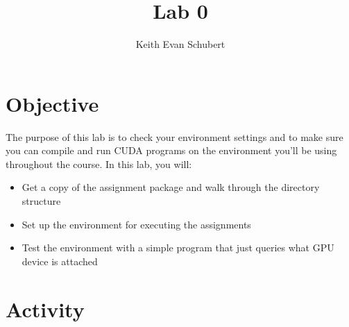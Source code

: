 \documentclass{article}
\title{Lab 0}
\author{Keith Evan Schubert}
\begin{document}
\maketitle

\section{Objective}
The purpose of this lab is to check your environment settings and to make sure you can compile and run CUDA programs on the environment you’ll be using throughout the course.  In this lab, you will:
\begin{itemize}
\item Get a copy of the assignment package and walk through the directory structure
\item Set up the environment for executing the assignments
\item Test the environment with a simple program that just queries what GPU device is attached
\end{itemize}

\section{Activity}
\end{document}
